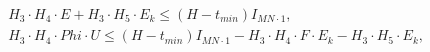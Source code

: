 \begin{align}
  &  H_{3} \cdot H_{4} \cdot E + H_{3} \cdot H_{5} \cdot E_{k} \leq \left(H - t_{min}\right) I_{M N \cdot 1} ,  \tag{eq\_0041} \\
  &  H_{3} \cdot H_{4} \cdot \mathit{Phi} \cdot U \leq \left(H - t_{min}\right) I_{M N \cdot 1} - H_{3} \cdot H_{4} \cdot F \cdot E_{k} - H_{3} \cdot H_{5} \cdot E_{k} ,  \tag{eq\_0042} \\
\end{align}
